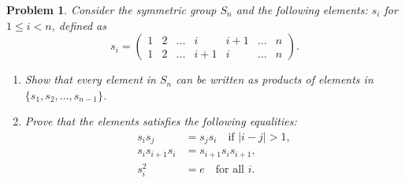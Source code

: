 \documentclass{article}
\newtheorem{ex}{Problem}
\begin{document}
\begin{ex}
Consider the symmetric group $S_n$ and the following elements:
$s_i$ for $1 \leq i < n$, defined as
\[  s_i = \begin{pmatrix}
1 & 2 & \ldots & i & i+1 & \ldots & n \\
1 & 2 & \ldots & i+1 & i & \ldots & n
\end{pmatrix}.\]
\begin{enumerate}
  \item Show that every element in $S_n$ can be written as products of elements in $\{s_1, s_2, \ldots, s_{n-1}\}$.
  \item Prove that the elements satisfies the following equalities:
  \begin{align*}  
    s_i s_j &= s_j s_i \quad \text{if } |i - j| > 1, \\
    s_i s_{i+1} s_i&= s_{i+1} s_i s_{i+1}, \\
    s_i^2 &= e \quad \text{for all } i.
  \end{align*}
\end{enumerate} 
\end{ex}
\end{document}
